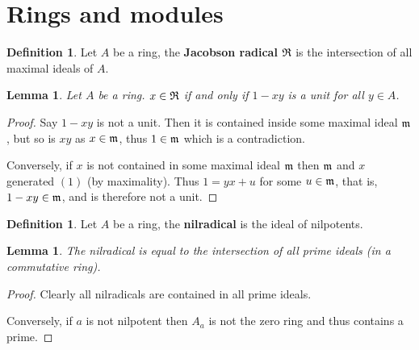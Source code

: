 \documentclass[12pt]{article}
\theoremstyle{plain}
\newtheorem{lemma}[thm]{Lemma}
\theoremstyle{definition}
\newtheorem{defn}[thm]{Definition} %
\begin{document}
	
	\section{Rings and modules}
	\begin{defn}
		Let $A$ be a ring, the \textbf{Jacobson radical} $\frak{R}$ is the intersection of all maximal ideals of $A$.
	\end{defn}
	\begin{lemma}
		Let $A$ be a ring. $x \in \frak{R}$ if and only if $1 - xy$ is a unit for all $y \in A$.
	\end{lemma}
	\begin{proof}
		Say $1 - xy$ is not a unit. Then it is contained inside some maximal ideal $\frak{m}$, but so is $xy$ as $x \in \frak{m}$, thus $1 \in \frak{m}$ which is a contradiction.
		
		Conversely, if $x$ is not contained in some maximal ideal $\frak{m}$ then $\frak{m}$ and $x$ generated $(1)$ (by maximality). Thus $1 = yx + u$ for some $u \in \frak{m}$, that is, $1 - xy \in \frak{m}$, and is therefore not a unit.
	\end{proof}
	\begin{defn}
		\label{def:nilradical_one}
		Let $A$ be a ring, the \textbf{nilradical} is the ideal of nilpotents.
	\end{defn}
	\begin{lemma}
		\label{lem:intersection_primes}
		The nilradical is equal to the intersection of all prime ideals (in a commutative ring).
	\end{lemma}
	\begin{proof}
		Clearly all nilradicals are contained in all prime ideals.
		
		Conversely, if $a$ is not nilpotent then $A_{a}$ is not the zero ring and thus contains a prime.
	\end{proof}
	
\end{document}
